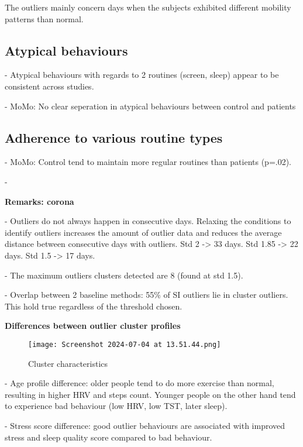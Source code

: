 The outliers mainly concern days when the subjects exhibited different mobility patterns than normal.
\fi 

\subsection*{Atypical behaviours}

- Atypical behaviours with regards to 2 routines (screen, sleep) appear to be consistent across studies.

- MoMo: No clear seperation in atypical behaviours between control and patients

\subsection*{Adherence to various routine types}

- MoMo: Control tend to maintain more regular routines than patients (p=.02).

- 

\textbf{Remarks: corona}

- Outliers do not always happen in consecutive days. Relaxing the conditions to identify outliers increases the amount of outlier data and reduces the average distance between consecutive days with outliers. Std 2 -> 33  days. Std 1.85 -> 22 days. Std 1.5 -> 17 days.

- The maximum outliers clusters detected are 8 (found at std 1.5).

- Overlap between 2 baseline methods: 55\% of SI outliers lie in cluster outliers. This hold true regardless of the threshold chosen.


\textbf{Differences between outlier cluster profiles}

\begin{figure}[!htbp]
    \centering
    \texttt{[image: Screenshot 2024-07-04 at 13.51.44.png]}
    \caption{Cluster characteristics}
    \label{fig:enter-label}
\end{figure}

- Age profile difference: older people tend to do more exercise than normal, resulting in higher HRV and steps count. Younger people on the other hand tend to experience bad behaviour (low HRV, low TST, later sleep).

- Stress score difference: good outlier behaviours are associated with improved stress and sleep quality score compared to bad behaviour.
